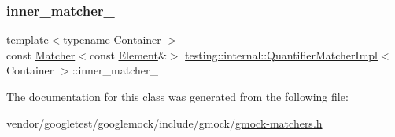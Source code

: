 \subsubsection{\texorpdfstring{inner\+\_\+matcher\+\_\+}{inner\_matcher\_}}
{\footnotesize\ttfamily template$<$typename Container $>$ \\
const \hyperlink{classtesting_1_1_matcher}{Matcher}$<$const \hyperlink{classtesting_1_1internal_1_1_quantifier_matcher_impl_a6f73e2e5fa853f8b5fdd33d6a1811f9e}{Element}\&$>$ \hyperlink{classtesting_1_1internal_1_1_quantifier_matcher_impl}{testing\+::internal\+::\+Quantifier\+Matcher\+Impl}$<$ Container $>$\+::inner\+\_\+matcher\+\_\+\hspace{0.3cm}{\ttfamily [protected]}}



The documentation for this class was generated from the following file\+:\begin{DoxyCompactItemize}
\item 
vendor/googletest/googlemock/include/gmock/\hyperlink{gmock-matchers_8h}{gmock-\/matchers.\+h}\end{DoxyCompactItemize}

